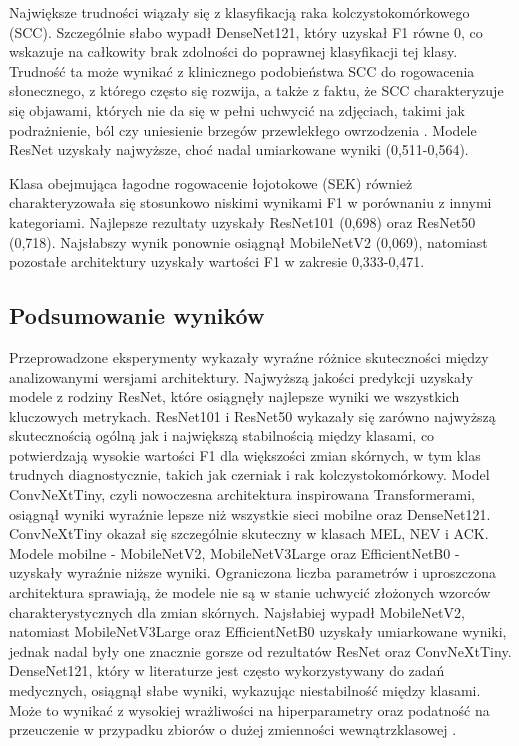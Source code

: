 Największe trudności wiązały się z klasyfikacją raka kolczystokomórkowego (SCC).
Szczególnie słabo wypadł DenseNet121, który uzyskał F1 równe 0, co wskazuje na całkowity brak zdolności do poprawnej klasyfikacji tej klasy.
Trudność ta może wynikać z klinicznego podobieństwa SCC do rogowacenia słonecznego, z którego często się rozwija, a także z faktu, że SCC charakteryzuje się objawami, których nie da się w pełni uchwycić na zdjęciach, takimi jak podrażnienie, ból czy uniesienie brzegów przewlekłego owrzodzenia \cite{Bourke_2010}.
Modele ResNet uzyskały najwyższe, choć nadal umiarkowane wyniki (0,511-0,564).

Klasa obejmująca łagodne rogowacenie łojotokowe (SEK) również charakteryzowała się stosunkowo niskimi wynikami F1 w porównaniu z innymi kategoriami.
Najlepsze rezultaty uzyskały ResNet101 (0,698) oraz ResNet50 (0,718).
Najsłabszy wynik ponownie osiągnął MobileNetV2 (0,069), natomiast pozostałe architektury uzyskały wartości F1 w zakresie 0,333-0,471.

\subsection{Podsumowanie wyników}
Przeprowadzone eksperymenty wykazały wyraźne różnice skuteczności między analizowanymi wersjami architektury.
Najwyższą jakości predykcji uzyskały modele z rodziny ResNet, które osiągnęły najlepsze wyniki we wszystkich kluczowych metrykach.
ResNet101 i ResNet50 wykazały się zarówno najwyższą skutecznością ogólną jak i największą stabilnością między klasami, co potwierdzają wysokie wartości F1 dla większości zmian skórnych, w tym klas trudnych diagnostycznie, takich jak czerniak i rak kolczystokomórkowy.
Model ConvNeXtTiny, czyli nowoczesna architektura inspirowana Transformerami, osiągnął wyniki wyraźnie lepsze niż wszystkie sieci mobilne oraz DenseNet121.
ConvNeXtTiny okazał się szczególnie skuteczny w klasach MEL, NEV i ACK.
Modele mobilne - MobileNetV2, MobileNetV3Large oraz EfficientNetB0 - uzyskały wyraźnie niższe wyniki.
Ograniczona liczba parametrów i uproszczona architektura sprawiają, że modele nie są w stanie uchwycić złożonych wzorców charakterystycznych dla zmian skórnych.
Najsłabiej wypadł MobileNetV2, natomiast MobileNetV3Large oraz EfficientNetB0 uzyskały umiarkowane wyniki, jednak nadal były one znacznie gorsze od rezultatów ResNet oraz ConvNeXtTiny.
DenseNet121, który w literaturze jest często wykorzystywany do zadań medycznych, osiągnął słabe wyniki, wykazując niestabilność między klasami.
Może to wynikać z wysokiej wrażliwości na hiperparametry oraz podatność na przeuczenie w przypadku zbiorów o dużej zmienności wewnątrzklasowej \cite{huang2018denselyconnectedconvolutionalnetworks}.

